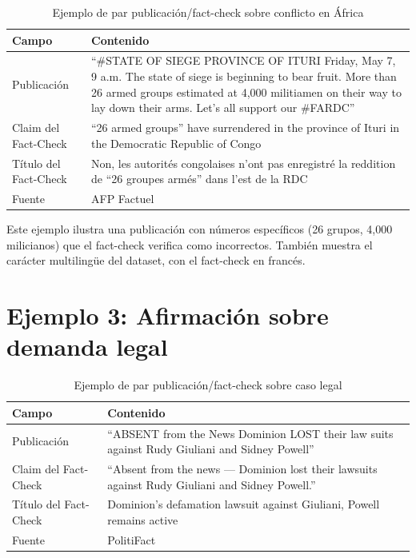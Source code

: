 \documentclass[a4paper,openany]{memoir}
\begin{document}
\begin{table}[htbp]
\centering
\caption{Ejemplo de par publicación/fact-check sobre conflicto en África}
\label{tab:ejemplo2}
\begin{tabular}{p{3cm}p{10cm}}
\toprule
\textbf{Campo} & \textbf{Contenido} \\
\midrule
Publicación & ``\#STATE OF SIEGE PROVINCE OF ITURI Friday, May 7, 9 a.m. The state of siege is beginning to bear fruit. More than 26 armed groups estimated at 4,000 militiamen on their way to lay down their arms. Let's all support our \#FARDC'' \\
\midrule
Claim del Fact-Check & ``26 armed groups'' have surrendered in the province of Ituri in the Democratic Republic of Congo \\
\midrule
Título del Fact-Check & Non, les autorités congolaises n'ont pas enregistré la reddition de ``26 groupes armés'' dans l'est de la RDC \\
\midrule
Fuente & AFP Factuel \\
\bottomrule
\end{tabular}
\end{table}

Este ejemplo ilustra una publicación con números específicos (26 grupos, 4,000 milicianos) que el fact-check verifica como incorrectos. También muestra el carácter multilingüe del dataset, con el fact-check en francés.

\section{Ejemplo 3: Afirmación sobre demanda legal}

\begin{table}[htbp]
\centering
\caption{Ejemplo de par publicación/fact-check sobre caso legal}
\label{tab:ejemplo3}
\begin{tabular}{p{3cm}p{10cm}}
\toprule
\textbf{Campo} & \textbf{Contenido} \\
\midrule
Publicación & ``ABSENT from the News Dominion LOST their law suits against Rudy Giuliani and Sidney Powell'' \\
\midrule
Claim del Fact-Check & ``Absent from the news --- Dominion lost their lawsuits against Rudy Giuliani and Sidney Powell.'' \\
\midrule
Título del Fact-Check & Dominion's defamation lawsuit against Giuliani, Powell remains active \\
\midrule
Fuente & PolitiFact \\
\bottomrule
\end{tabular}
\end{table}
\end{document}
